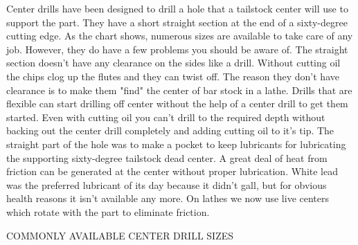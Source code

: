 Center drills have been designed to drill a hole that a tailstock center will
use to support the part. They have a short straight section at the end of a
sixty-degree cutting edge. As the chart shows, numerous sizes are available to
take care of any job. However, they do have a few problems you should be aware
of. The straight section doesn't have any clearance on the sides like a drill.
Without cutting oil the chips clog up the flutes and they can twist off. The
reason they don't have clearance is to make them "find" the center of bar stock
in a lathe. Drills that are flexible can start drilling off center without the
help of a center drill to get them started. Even with cutting oil you can't
drill to the required depth without backing out the center drill completely and
adding cutting oil to it's tip. The straight part of the hole was to make a
pocket to keep lubricants for lubricating the supporting sixty-degree tailstock
dead center. A great deal of heat from friction can be generated at the center
without proper lubrication. White lead was the preferred lubricant of its day
because it didn't gall, but for obvious health reasons it isn't available any
more. On lathes we now use live centers which rotate with the part to eliminate
friction.

COMMONLY AVAILABLE CENTER DRILL SIZES



\secup


\secup
